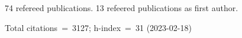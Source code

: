74 refereed publications. 13 refeered publications as first author.

Total citations~=~3127; h-index~=~31 (2023-02-18)